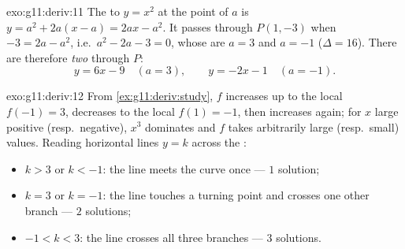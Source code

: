 \begin{solution}{exo:g11:deriv:11}
The  to $y = x^2$ at the point of  $a$ is
$y = a^2 + 2a(x - a) = 2ax - a^2$. It passes through $P(1, -3)$ when
$-3 = 2a - a^2$, i.e.\ $a^2 - 2a - 3 = 0$, whose  are $a = 3$ and
$a = -1$ ($\Delta = 16$). There are therefore \emph{two}  through
$P$:
\[
y = 6x - 9 \quad (a = 3),
\qquad
y = -2x - 1 \quad (a = -1).
\]
\end{solution}

\begin{solution}{exo:g11:deriv:12}
From \cref{ex:g11:deriv:study}, $f$ increases up to the local 
$f(-1) = 3$, decreases to the local  $f(1) = -1$, then increases
again; for $x$ large positive (resp.\ negative), $x^3$ dominates and $f$
takes arbitrarily large (resp.\ small) values. Reading horizontal lines
$y = k$ across the :
\begin{itemize}
  \item $k > 3$ or $k < -1$: the line meets the curve once
        --- $1$ solution;
  \item $k = 3$ or $k = -1$: the line touches a turning point and crosses
        one other branch --- $2$ solutions;
  \item $-1 < k < 3$: the line crosses all three branches --- $3$
        solutions.
\end{itemize}
\end{solution}

